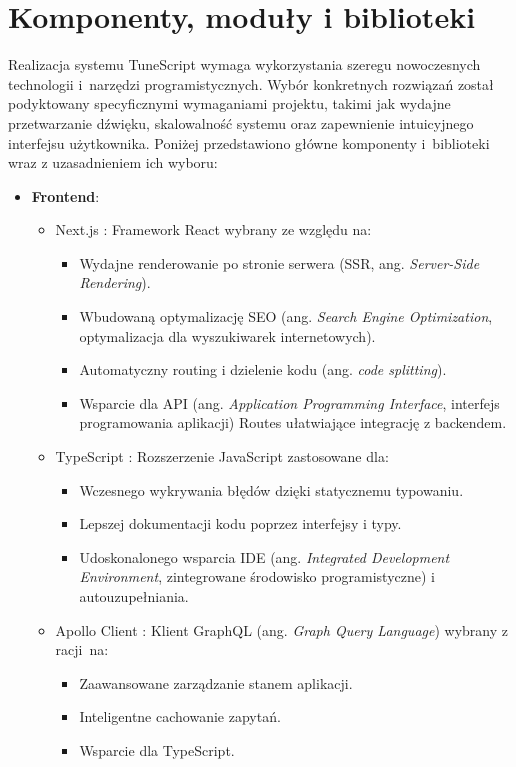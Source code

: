 \documentclass[a4paper,twoside,12pt]{book}
\begin{document}
\section{Komponenty, moduły i biblioteki}
Realizacja systemu TuneScript wymaga wykorzystania szeregu nowoczesnych technologii i~narzędzi programistycznych. Wybór konkretnych rozwiązań został podyktowany specyficznymi wymaganiami projektu, takimi jak wydajne przetwarzanie dźwięku, skalowalność systemu oraz zapewnienie intuicyjnego interfejsu użytkownika. Poniżej przedstawiono główne komponenty i~biblioteki wraz z uzasadnieniem ich wyboru:
\begin{itemize}
    \item \textbf{Frontend}:
          \begin{itemize}
            \item Next.js \cite{bib:nextjs}: Framework React wybrany ze względu na:
                  \begin{itemize}
                    \item Wydajne renderowanie po stronie serwera (SSR, ang. \textit{Server-Side Rendering}).
                    \item Wbudowaną optymalizację SEO (ang. \textit{Search Engine Optimization}, optymalizacja dla wyszukiwarek internetowych).
                    \item Automatyczny routing i dzielenie kodu (ang. \textit{code splitting}).
                    \item Wsparcie dla API (ang. \textit{Application Programming Interface}, interfejs programowania aplikacji) Routes ułatwiające integrację z backendem.
                  \end{itemize}
            \item TypeScript \cite{bib:typescript}: Rozszerzenie JavaScript zastosowane dla:
                  \begin{itemize}
                    \item Wczesnego wykrywania błędów dzięki statycznemu typowaniu.
                    \item Lepszej dokumentacji kodu poprzez interfejsy i typy.
                    \item Udoskonalonego wsparcia IDE (ang. \textit{Integrated Development Environment}, zintegrowane środowisko programistyczne) i autouzupełniania.
                  \end{itemize}
            \item Apollo Client \cite{bib:apollo}: Klient GraphQL (ang. \textit{Graph Query Language}) wybrany z racji~na:
                  \begin{itemize}
                    \item Zaawansowane zarządzanie stanem aplikacji.
                    \item Inteligentne cachowanie zapytań.
                    \item Wsparcie dla TypeScript.
                  \end{itemize}
          \end{itemize}
    

\end{itemize}
\end{document}
